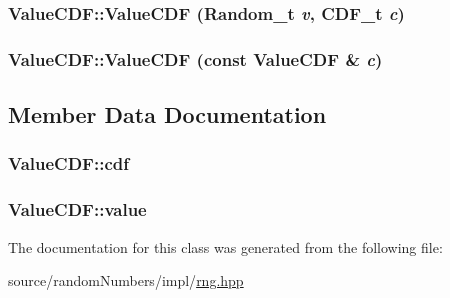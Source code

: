 \hypertarget{classValueCDF_234760674403fcf6b91be1aa5927584c}{
\subsubsection[{ValueCDF}]{\setlength{\rightskip}{0pt plus 5cm}ValueCDF::ValueCDF ({\bf Random\_\-t} {\em v}, \/  {\bf CDF\_\-t} {\em c})}}
\label{classValueCDF_234760674403fcf6b91be1aa5927584c}


\hypertarget{classValueCDF_e24002eb4692735666adfa50b1ccabba}{
\subsubsection[{ValueCDF}]{\setlength{\rightskip}{0pt plus 5cm}ValueCDF::ValueCDF (const {\bf ValueCDF} \& {\em c})}}
\label{classValueCDF_e24002eb4692735666adfa50b1ccabba}




\subsection{Member Data Documentation}
\hypertarget{classValueCDF_111ae2eb1b5618b9cf6c5a59da10fb18}{
\subsubsection[{cdf}]{ {\bf ValueCDF::cdf}}}
\label{classValueCDF_111ae2eb1b5618b9cf6c5a59da10fb18}


\hypertarget{classValueCDF_3199cb7b55c7759bc3b4b231ba321e0e}{
\subsubsection[{value}]{ {\bf ValueCDF::value}}}
\label{classValueCDF_3199cb7b55c7759bc3b4b231ba321e0e}




The documentation for this class was generated from the following file:\begin{CompactItemize}
\item 
source/randomNumbers/impl/\hyperlink{rng_8hpp}{rng.hpp}\end{CompactItemize}

